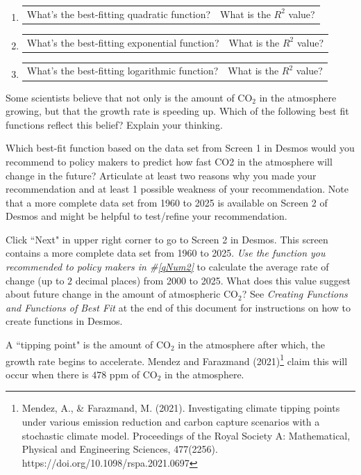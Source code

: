 \documentclass[11pt]{article}
\begin{document}
{\begin{enumerate}
\item \begin{tabular}{p{4in} l} What's the best-fitting quadratic function? & What is the $R^2$ value?\end{tabular}
\item \begin{tabular}{p{4in} l} What's the best-fitting exponential function? & What is the $R^2$ value?\end{tabular}
\item\begin{tabular}{p{4in} l} What's the best-fitting logarithmic function? & What is the $R^2$ value?\end{tabular}
\end{enumerate} 
 \item Some scientists believe that not only is the amount of CO$_2$ in the atmosphere growing, but that the growth rate is speeding up.  Which of the following best fit functions reflect this belief? Explain your thinking.
 \newpage
\item   Which best-fit function based on the data set from Screen 1 in Desmos would you recommend to policy makers to predict how fast CO2 in the atmosphere will change in the future?  Articulate at least two reasons why you made your recommendation and at least 1 possible weakness of your recommendation. Note that a more complete data set from 1960 to 2025 is available on Screen 2 of Desmos and might be helpful to test/refine your recommendation. \label{qNum2}
\item Click ``Next" in upper right corner to go to Screen 2 in Desmos.  This screen  contains a more complete data set from 1960 to 2025.   {\em Use the function you recommended to policy makers in \#\ref{qNum2}} to calculate the average rate of change (up to $2$ decimal places) from 2000 to 2025.  What does this value suggest about future change in the amount of atmospheric CO$_2$? See {\em Creating Functions and Functions of Best Fit} at the end of this document for instructions on how to create functions in Desmos.
\newpage
 \item A ``tipping point" is the amount of CO$_2$ in the atmosphere after which, the growth rate begins to accelerate.  Mendez and Farazmand (2021)\footnote{Mendez, A., \& Farazmand, M. (2021). Investigating climate tipping points under various emission reduction and carbon capture scenarios with a stochastic climate model. Proceedings of the Royal Society A: Mathematical, Physical and Engineering Sciences, 477(2256). https://doi.org/10.1098/rspa.2021.0697} claim this will occur when there is $478$ ppm of CO$_2$ in the atmosphere. 
\vfill

}

  \newpage

\end{document}
